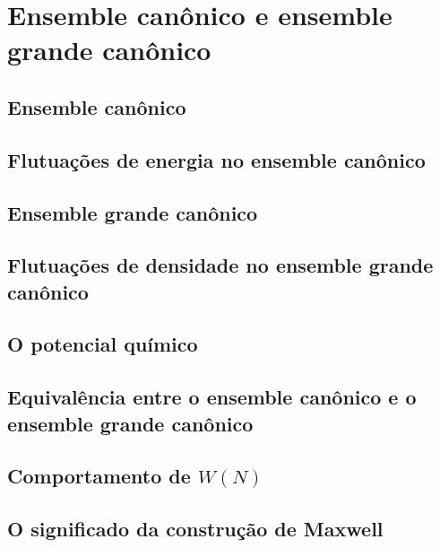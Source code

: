 \chapter{Ensemble canônico e ensemble grande canônico}
\noindent

\section{Ensemble canônico}
\label{ensemble_canonico}
\noindent

\section{Flutuações de energia no ensemble canônico}
\noindent

\section{Ensemble grande canônico}
\noindent

\section{Flutuações de densidade no ensemble grande canônico}
\noindent

\section{O potencial químico}
\noindent

\section{Equivalência entre o ensemble canônico e o ensemble grande canônico}
\noindent

\section{Comportamento de $W(N)$}
\noindent

\section{O significado da construção de Maxwell}
\noindent